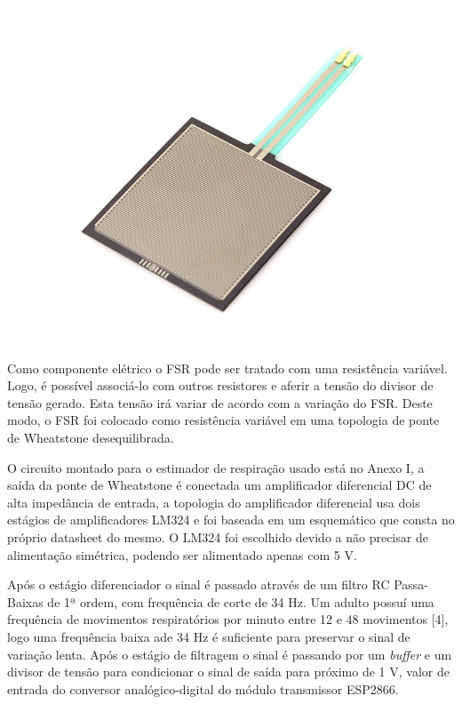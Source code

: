     \begin{center}
    	\includegraphics[scale=0.4]{figuras/fsr_model.jpg}
        \label{fsr_model}
    \end{center}

	Como componente elétrico o FSR pode ser tratado com uma resistência variável. Logo, é possível associá-lo com outros resistores e aferir a tensão do divisor de tensão gerado. Esta tensão irá variar de acordo com a variação do FSR. Deste modo, o FSR foi colocado como resistência variável em uma topologia de ponte de Wheatstone desequilibrada.
    
	O circuito montado para o estimador de respiração usado está no Anexo I, a saída da ponte de Wheatstone é conectada um amplificador diferencial DC de alta impedância de entrada, a topologia do amplificador diferencial usa dois estágios de amplificadores LM324 e foi baseada em um esquemático que consta no próprio datasheet do mesmo. O LM324 foi escolhido devido a não precisar de alimentação simétrica, podendo ser alimentado apenas com 5 V. 
    
	Após o estágio diferenciador o sinal é passado através de um filtro RC Passa-Baixas de 1ª ordem, com frequência de corte de 34 Hz. Um adulto possuí uma frequência de movimentos respiratórios por minuto entre 12 e 48 movimentos [4], logo uma frequência baixa ade 34 Hz é suficiente para preservar o sinal de variação lenta. Após o estágio de filtragem o sinal é passando por um \textit{buffer} e um divisor de tensão para condicionar o sinal de saída para próximo de 1 V, valor de entrada do conversor analógico-digital do módulo transmissor ESP2866.
    
